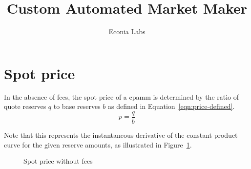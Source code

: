 \documentclass[table, twocolumn]{article}
\title{Custom Automated Market Maker}
\author{Econia Labs}
\date{}
\begin{document}

\maketitle

\section{Spot price}\label{sec:spot-price}

In the absence of fees, the spot price of a \gls*{cpamm} is determined by the ratio of
quote reserves $q$ to base reserves $b$ as defined in Equation~\ref{eqn:price-defined}.
\begin{equation}\label{eqn:price-defined}
  p = \frac{q}{b}
\end{equation}

Note that this represents the instantaneous derivative of the constant product curve
for the given reserve amounts, as illustrated in Figure~\ref{fig:spot-price-no-fees}.

\begin{figure}[!htb]
	\centering
	
	\caption{Spot price without fees}\label{fig:spot-price-no-fees}
\end{figure}
\end{document}
